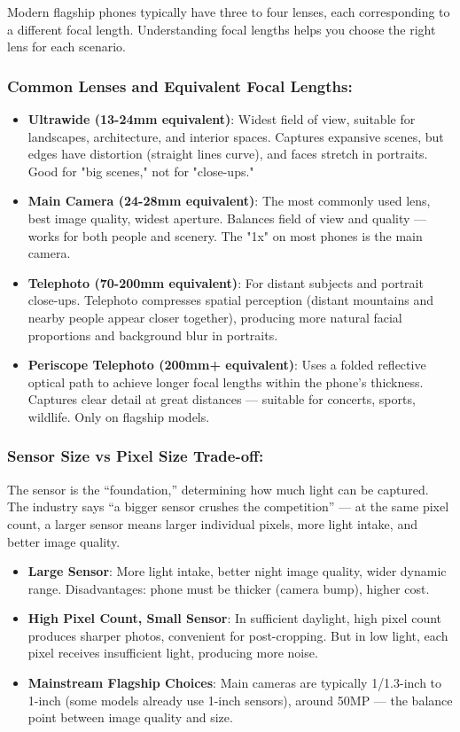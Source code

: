 
Modern flagship phones typically have three to four lenses, each corresponding to a different focal length. Understanding focal lengths helps you choose the right lens for each scenario.

\subsubsection*{Common Lenses and Equivalent Focal Lengths:}

\begin{itemize}
  \item \textbf{Ultrawide (13-24mm equivalent)}: Widest field of view, suitable for landscapes, architecture, and interior spaces. Captures expansive scenes, but edges have distortion (straight lines curve), and faces stretch in portraits. Good for "big scenes," not for "close-ups."
  \item \textbf{Main Camera (24-28mm equivalent)}: The most commonly used lens, best image quality, widest aperture. Balances field of view and quality — works for both people and scenery. The "1x" on most phones is the main camera.
  \item \textbf{Telephoto (70-200mm equivalent)}: For distant subjects and portrait close-ups. Telephoto compresses spatial perception (distant mountains and nearby people appear closer together), producing more natural facial proportions and background blur in portraits.
  \item \textbf{Periscope Telephoto (200mm+ equivalent)}: Uses a folded reflective optical path to achieve longer focal lengths within the phone's thickness. Captures clear detail at great distances — suitable for concerts, sports, wildlife. Only on flagship models.
\end{itemize}

\subsubsection*{Sensor Size vs Pixel Size Trade-off:}

The sensor is the “foundation,” determining how much light can be captured. The industry says “a bigger sensor crushes the competition” — at the same pixel count, a larger sensor means larger individual pixels, more light intake, and better image quality.

\begin{itemize}
  \item \textbf{Large Sensor}: More light intake, better night image quality, wider dynamic range. Disadvantages: phone must be thicker (camera bump), higher cost.
  \item \textbf{High Pixel Count, Small Sensor}: In sufficient daylight, high pixel count produces sharper photos, convenient for post-cropping. But in low light, each pixel receives insufficient light, producing more noise.
  \item \textbf{Mainstream Flagship Choices}: Main cameras are typically 1/1.3-inch to 1-inch (some models already use 1-inch sensors), around 50MP — the balance point between image quality and size.
\end{itemize}

